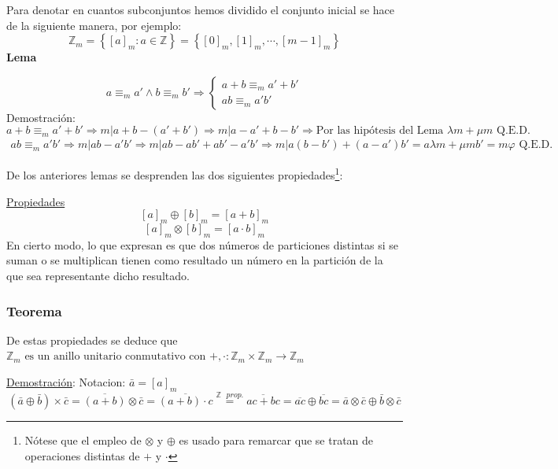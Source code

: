 \documentclass[10pt,a4paper,openright]{book}
\theoremstyle{break}
\begin{document}
Para denotar en cuantos subconjuntos hemos dividido el conjunto inicial se hace de la siguiente manera, por ejemplo:
$$\mathbb Z_m=\left\lbrace [a]_m : a\in \mathbb Z\right\rbrace=\left\lbrace [0]_m, [1]_m, \cdots, [m-1]_m\right\rbrace$$
\textbf{Lema}\par
$$a\equiv_m a' \wedge b\equiv_m b' \Rightarrow
\begin{cases}
 a+b\equiv_m a'+b' \\
 ab\equiv_m a'b'
\end{cases}
$$
Demostración:
$$a+b\equiv_m a'+b'\Rightarrow m|a+b-(a'+b')\Rightarrow m|a-a'+b-b'\Rightarrow \mbox{Por las hipótesis del Lema } \lambda m + \mu m \mbox{ Q.E.D.}$$
\begin{gather*}
ab\equiv_m a'b'\Rightarrow m|ab-a'b'\Rightarrow m|ab-ab'+ab'-a'b'\Rightarrow m|a(b-b')+(a-a')b'=a\lambda m + \mu m b'=m\varphi \mbox{ Q.E.D.}
\end{gather*}

De los anteriores lemas se desprenden las dos siguientes propiedades\footnote{Nótese que el empleo de $\otimes$ y $\oplus$ es usado para remarcar que se tratan de operaciones distintas de $+$ y $\cdot$}:\par
\underline{Propiedades}
$$[a]_m \oplus [b]_m=[a+b]_m$$
$$[a]_m \otimes [b]_m=[a\cdot b]_m$$
En cierto modo, lo que expresan es que dos números de particiones distintas si se suman o se multiplican tienen como resultado un número en la partición de la que sea representante dicho resultado.

\subsubsection*{Teorema}
De estas propiedades se deduce que $\mathbb Z_m \mbox{ es un anillo  unitario conmutativo con }+,\cdot : \mathbb Z_m \times \mathbb Z_m \rightarrow \mathbb Z_m$\par
\underline{Demostración}: Notacion: $\bar{a}=[a]_m$
$$(\bar{a}\oplus \bar{b})\times\bar{c}=\overline{(a+b)}\otimes\bar{c}=\overline{(a+b)\cdot c}\stackrel{\mathbb Z\mbox{ }prop.}{=}\overline{ac+bc}=\overline{ac}\oplus\overline{bc}=\bar{a}\otimes\bar{c}\oplus\bar{b}\otimes\bar{c}$$
\end{document}

